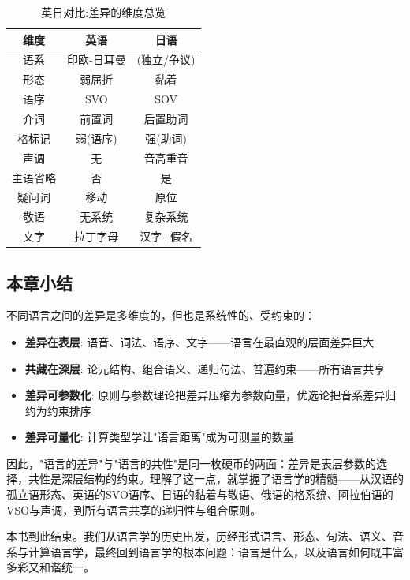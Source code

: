 \begin{table}[H]
\centering
\caption{英日对比:差异的维度总览}
\begin{tabulary}{\textwidth}{@{}CCC@{}}
\toprule
\textbf{维度} & \textbf{英语} & \textbf{日语} \\
\midrule
语系 & 印欧-日耳曼 & (独立/争议) \\
形态 & 弱屈折 & 黏着 \\
语序 & SVO & SOV \\
介词 & 前置词 & 后置助词 \\
格标记 & 弱(语序) & 强(助词) \\
声调 & 无 & 音高重音 \\
主语省略 & 否 & 是 \\
疑问词 & 移动 & 原位 \\
敬语 & 无系统 & 复杂系统 \\
文字 & 拉丁字母 & 汉字+假名 \\
\bottomrule
\end{tabulary}
\end{table}

\subsection{本章小结}

不同语言之间的差异是多维度的，但也是系统性的、受约束的：
\begin{itemize}
    \item \textbf{差异在表层}: 语音、词法、语序、文字——语言在最直观的层面差异巨大
    \item \textbf{共藏在深层}: 论元结构、组合语义、递归句法、普遍约束——所有语言共享
    \item \textbf{差异可参数化}: 原则与参数理论把差异压缩为参数向量，优选论把音系差异归约为约束排序
    \item \textbf{差异可量化}: 计算类型学让"语言距离"成为可测量的数量
\end{itemize}

因此，"语言的差异"与"语言的共性"是同一枚硬币的两面：差异是表层参数的选择，共性是深层结构的约束。理解了这一点，就掌握了语言学的精髓——从汉语的孤立语形态、英语的SVO语序、日语的黏着与敬语、俄语的格系统、阿拉伯语的VSO与声调，到所有语言共享的递归性与组合原则。

本书到此结束。我们从语言学的历史出发，历经形式语言、形态、句法、语义、音系与计算语言学，最终回到语言学的根本问题：语言是什么，以及语言如何既丰富多彩又和谐统一。

